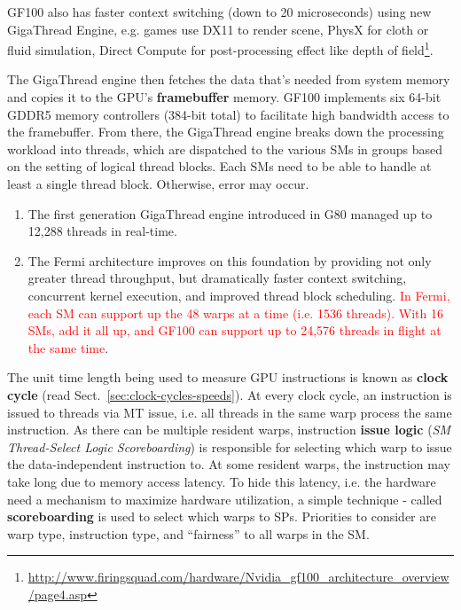 \begin{framed}
    GF100 also has faster context switching (down to 20 microseconds)
    using new GigaThread Engine, e.g. games use DX11 to render scene,
    PhysX for cloth or fluid 
    simulation, Direct Compute for post-processing effect like depth of
    field\footnote{\url{http://www.firingsquad.com/hardware/Nvidia_gf100_architecture_overview/page4.asp}}.
\end{framed}

The GigaThread engine then fetches the data that's needed from system memory and
copies it to the GPU's {\bf framebuffer} memory. GF100 implements six 64-bit
GDDR5 memory controllers (384-bit total) to facilitate high bandwidth access to
the framebuffer. From there, the GigaThread engine breaks down the processing
workload into threads, which are dispatched to the various SMs in groups based
on the setting of logical thread blocks.  Each SMs need to be able to handle at
least a single thread block. Otherwise, error may occur.

\begin{enumerate}
\item The first generation GigaThread engine introduced in G80 managed
  up to 12,288 threads in real-time. 

\item The Fermi architecture improves on this foundation by providing
  not only greater thread throughput, but dramatically faster context
  switching, concurrent kernel execution, and improved thread block
  scheduling.
  \textcolor{red}{ In Fermi, each SM can support up the 48 warps at a
    time (i.e. 1536 threads). With 16 SMs, add it all up, and GF100
    can support up to 24,576 threads in flight at the same time}.
\end{enumerate}

The unit time length being used to measure GPU instructions is known
as {\bf clock cycle} (read Sect.~\ref{sec:clock-cycles-speeds}). At
every clock cycle, an instruction is issued to threads via MT issue,
i.e. all threads in the same warp process the same instruction.  As
there can be multiple resident warps, instruction {\bf issue logic}
({\it SM Thread-Select Logic Scoreboarding}) is responsible for
selecting which warp to issue the data-independent instruction to. At
some resident warps, the instruction may take long due to memory
access latency. To hide this latency, i.e. the hardware need a
mechanism to maximize hardware utilization, a simple technique -
called {\bf scoreboarding} is used to select which warps to
SPs. Priorities to consider are warp type, instruction type, and
``fairness'' to all warps in the SM.

